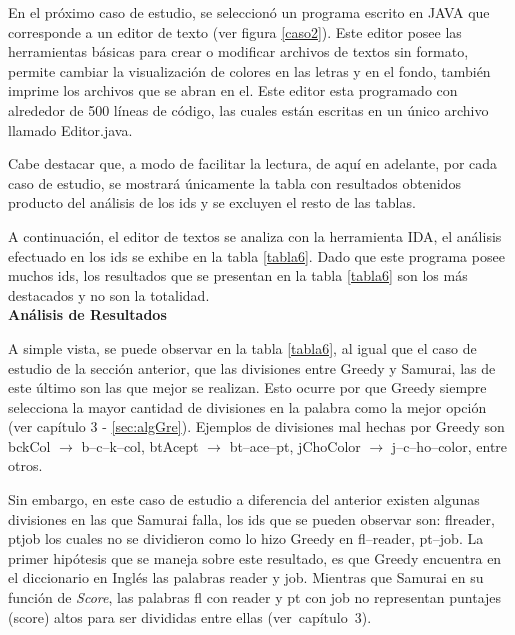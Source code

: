 En el próximo caso de estudio, se seleccionó un programa escrito en JAVA que corresponde a un editor de texto (ver figura \ref{caso2}). Este editor posee las herramientas básicas para crear o modificar archivos de textos sin formato, permite cambiar la visualización de colores en las letras y en el fondo, también imprime los archivos que se abran en el.
Este editor esta programado con alrededor de 500 líneas de código, las cuales están escritas en un único archivo llamado Editor.java. 

Cabe destacar que, a modo de facilitar la lectura, de aquí en adelante, por cada caso de estudio, se mostrará únicamente la tabla con resultados obtenidos producto del análisis de los ids y se excluyen el resto de las tablas.

A continuación, el editor de textos se analiza con la herramienta IDA, el análisis efectuado en los ids se exhibe en la tabla \ref{tabla6}. Dado que este programa posee muchos ids, los resultados que se presentan en la tabla \ref{tabla6} son los más destacados y no son la totalidad.\\

\noindent \textbf{Análisis de Resultados\\}

A simple vista, se puede observar en la tabla \ref{tabla6}, al igual que el caso de estudio de la sección anterior, que las divisiones entre Greedy y Samurai, las de este último son las que mejor se realizan. Esto ocurre por que Greedy siempre selecciona la mayor cantidad de divisiones en la palabra como la mejor opción (ver capítulo 3 - \ref{sec:algGre}). Ejemplos de divisiones mal hechas por Greedy son \textsf{bckCol} $\rightarrow$ \textsf{b--c--k--col},
\textsf{btAcept} $\rightarrow$ \textsf{bt--ace--pt}, \textsf{jChoColor} $\rightarrow$ \textsf{j--c--ho--color}, entre otros. 

Sin embargo, en este caso de estudio a diferencia del anterior existen algunas divisiones en las que Samurai falla, los ids que se pueden observar son: \textsf{flreader}, \textsf{ptjob} los cuales no se dividieron como lo hizo Greedy en \mbox{\textsf{fl--reader}}, \textsf{pt--job}. La primer hipótesis que se maneja sobre este resultado, es que Greedy encuentra en el diccionario en Inglés las palabras \textsf{reader} y \textsf{job}. Mientras que Samurai en su función de \textit{Score}, las palabras \textsf{fl} con \textsf{reader} y \textsf{pt} con \textsf{job} no representan puntajes (score) altos para ser divididas entre ellas \mbox{(ver capítulo 3).}

